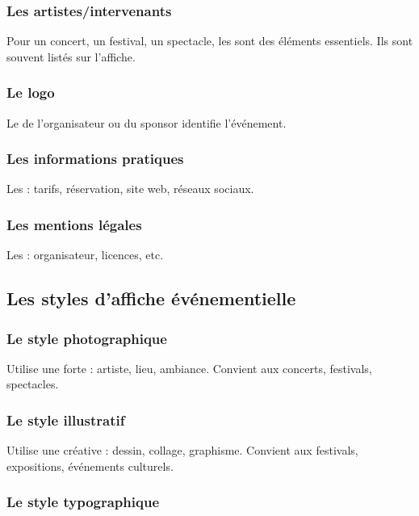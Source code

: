 \subsubsection{Les artistes/intervenants}

Pour un concert, un festival, un spectacle, les  sont des éléments essentiels. Ils sont souvent listés sur l'affiche.

\subsubsection{Le logo}

Le  de l'organisateur ou du sponsor identifie l'événement.

\subsubsection{Les informations pratiques}

Les  : tarifs, réservation, site web, réseaux sociaux.

\subsubsection{Les mentions légales}

Les  : organisateur, licences, etc.

\subsection{Les styles d'affiche événementielle}

\subsubsection{Le style photographique}

Utilise une  forte : artiste, lieu, ambiance. Convient aux concerts, festivals, spectacles.

\subsubsection{Le style illustratif}

Utilise une  créative : dessin, collage, graphisme. Convient aux festivals, expositions, événements culturels.

\subsubsection{Le style typographique}

